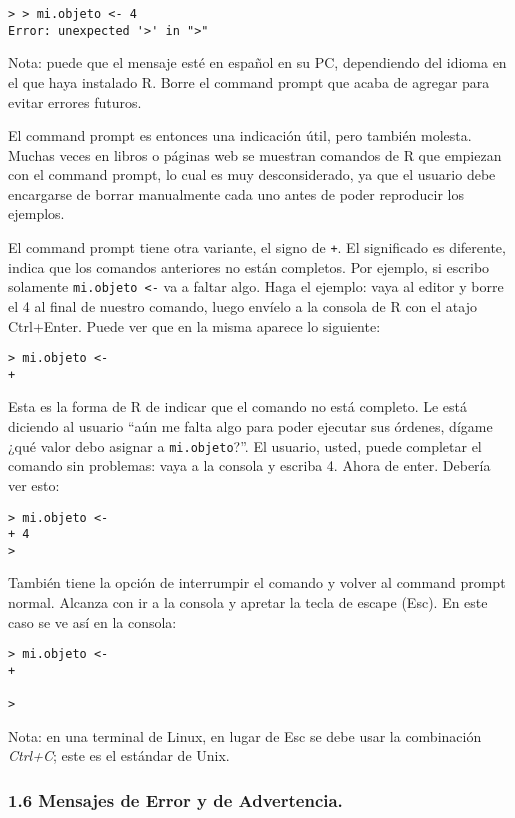 \documentclass[]{article}
\begin{document}
\begin{verbatim}
> > mi.objeto <- 4
Error: unexpected '>' in ">"
\end{verbatim}
Nota: puede que el mensaje esté en español en su PC, dependiendo del
idioma en el que haya instalado R. Borre el command prompt que acaba de
agregar para evitar errores futuros.

El command prompt es entonces una indicación útil, pero también molesta.
Muchas veces en libros o páginas web se muestran comandos de R que
empiezan con el command prompt, lo cual es muy desconsiderado, ya que el
usuario debe encargarse de borrar manualmente cada uno antes de poder
reproducir los ejemplos.

El command prompt tiene otra variante, el signo de \texttt{+}. El
significado es diferente, indica que los comandos anteriores no están
completos. Por ejemplo, si escribo solamente
\texttt{mi.objeto \textless{}-} va a faltar algo. Haga el ejemplo: vaya
al editor y borre el 4 al final de nuestro comando, luego envíelo a la
consola de R con el atajo Ctrl+Enter. Puede ver que en la misma aparece
lo siguiente:

\begin{verbatim}
> mi.objeto <-
+
\end{verbatim}
Esta es la forma de R de indicar que el comando no está completo. Le
está diciendo al usuario ``aún me falta algo para poder ejecutar sus
órdenes, dígame ¿qué valor debo asignar a \texttt{mi.objeto}?''. El
usuario, usted, puede completar el comando sin problemas: vaya a la
consola y escriba 4. Ahora de enter. Debería ver esto:

\begin{verbatim}
> mi.objeto <-
+ 4
>
\end{verbatim}
También tiene la opción de interrumpir el comando y volver al command
prompt normal. Alcanza con ir a la consola y apretar la tecla de escape
(Esc). En este caso se ve así en la consola:

\begin{verbatim}
> mi.objeto <-
+ 

>
\end{verbatim}
Nota: en una terminal de Linux, en lugar de Esc se debe usar la
combinación \emph{Ctrl+C}; este es el estándar de Unix.

\subsubsection{1.6 Mensajes de Error y de Advertencia.}
\end{document}
